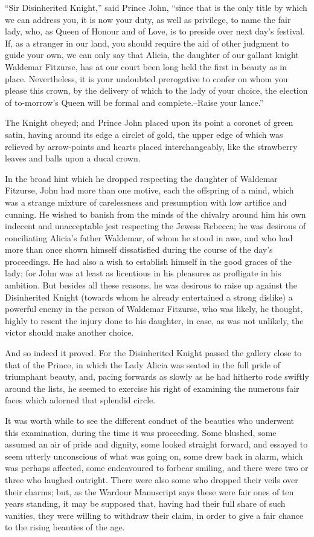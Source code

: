 ``Sir Disinherited Knight,'' said Prince John, ``since that is the only
title by which we can address you, it is now your duty, as well as
privilege, to name the fair lady, who, as Queen of Honour and of Love,
is to preside over next day's festival. If, as a stranger in our land,
you should require the aid of other judgment to guide your own, we can
only say that Alicia, the daughter of our gallant knight Waldemar
Fitzurse, has at our court been long held the first in beauty as in
place. Nevertheless, it is your undoubted prerogative to confer on whom
you please this crown, by the delivery of which to the lady of your
choice, the election of to-morrow's Queen will be formal and
complete.--Raise your lance.''

The Knight obeyed; and Prince John placed upon its point a coronet of
green satin, having around its edge a circlet of gold, the upper edge of
which was relieved by arrow-points and hearts placed interchangeably,
like the strawberry leaves and balls upon a ducal crown.

In the broad hint which he dropped respecting the daughter of Waldemar
Fitzurse, John had more than one motive, each the offspring of a mind,
which was a strange mixture of carelessness and presumption with low
artifice and cunning. He wished to banish from the minds of the chivalry
around him his own indecent and unacceptable jest respecting the Jewess
Rebecca; he was desirous of conciliating Alicia's father Waldemar, of
whom he stood in awe, and who had more than once shown himself
dissatisfied during the course of the day's proceedings. He had also a
wish to establish himself in the good graces of the lady; for John was
at least as licentious in his pleasures as profligate in his ambition.
But besides all these reasons, he was desirous to raise up against the
Disinherited Knight (towards whom he already entertained a strong
dislike) a powerful enemy in the person of Waldemar Fitzurse, who was
likely, he thought, highly to resent the injury done to his daughter, in
case, as was not unlikely, the victor should make another choice.

And so indeed it proved. For the Disinherited Knight passed the gallery
close to that of the Prince, in which the Lady Alicia was seated in the
full pride of triumphant beauty, and, pacing forwards as slowly as he
had hitherto rode swiftly around the lists, he seemed to exercise his
right of examining the numerous fair faces which adorned that splendid
circle.

It was worth while to see the different conduct of the beauties who
underwent this examination, during the time it was proceeding. Some
blushed, some assumed an air of pride and dignity, some looked straight
forward, and essayed to seem utterly unconscious of what was going on,
some drew back in alarm, which was perhaps affected, some endeavoured to
forbear smiling, and there were two or three who laughed outright. There
were also some who dropped their veils over their charms; but, as the
Wardour Manuscript says these were fair ones of ten years standing, it
may be supposed that, having had their full share of such vanities, they
were willing to withdraw their claim, in order to give a fair chance to
the rising beauties of the age.

